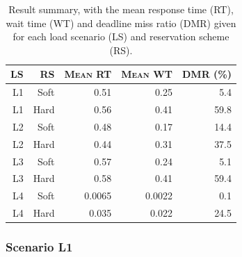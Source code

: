 \documentclass[times, 10pt,twocolumn]{article}
\begin{document}
\begin{table}[ht]
  \centering
  \begin{tabular}[t]{rrrrr} \hline
    \textsc{LS} & \textsc{RS} & \textsc{Mean RT} & \textsc{Mean WT} & \textsc{DMR (\%)} \\ \hline
    L1 & Soft & 0.51   & 0.25   & 5.4  \\
    L1 & Hard & 0.56   & 0.41   & 59.8 \\
    L2 & Soft & 0.48   & 0.17   & 14.4 \\
    L2 & Hard & 0.44   & 0.31   & 37.5 \\
    L3 & Soft & 0.57   & 0.24   & 5.1  \\
    L3 & Hard & 0.58   & 0.41   & 59.4 \\
    L4 & Soft & 0.0065 & 0.0022 & 0.1  \\
    L4 & Hard & 0.035  & 0.022  & 24.5 \\ \hline    
  \end{tabular}
  \caption{Result summary, with the mean response time (RT), wait time
  (WT) and deadline miss ratio (DMR) given for each load scenario (LS)
  and reservation scheme (RS).}
  \label{tab:summary}
\end{table}

\subsubsection{Scenario L1}
\label{sec:scenario-l1}
\end{document}

